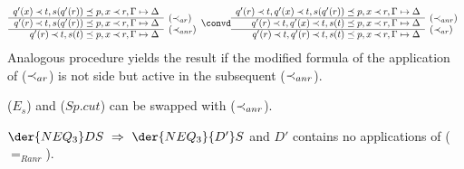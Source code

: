 \begin{PROOF}
\begin{LS}
\[ \begin{array}{rl}
q'(x)\Incl t, s(q'(r))\preceq p, x\Incl r, \Gamma\Seq\Delta \\ \cline{1-1}
q'(r)\Incl t, s(q'(r))\preceq p, x\Incl r, \Gamma\Seq\Delta  &
\raisebox{1.2ex}[1.5ex][0ex]{$(\Incl_{ar})$} \\ \cline{1-1}
q'(r)\Incl t, s(t)\preceq p, x\Incl r, \Gamma\Seq\Delta  &
\raisebox{1.2ex}[1.5ex][0ex]{$(\Incl_{anr})$}
\end{array} \convd
 \begin{array}{rl}
q'(r)\Incl t, q'(x)\Incl t, s(q'(r))\preceq p, x\Incl r, \Gamma\Seq\Delta \\ \cline{1-1}
q'(r)\Incl t, q'(x)\Incl t, s(t)\preceq p, x\Incl r, \Gamma\Seq\Delta  &
\raisebox{1.2ex}[1.5ex][0ex]{$(\Incl_{anr})$} \\ \cline{1-1}
q'(r)\Incl t, q'(r)\Incl t, s(t)\preceq p, x\Incl r, \Gamma\Seq\Delta  &
\raisebox{1.2ex}[1.5ex][0ex]{$(\Incl_{ar})$}
\end{array} \]
Analogous procedure yields the result if the modified formula of the
application of ($\mathbin{\prec}_{ar}$) is not side but active in the subsequent ($\mathbin{\prec}_{anr}$).
%
\item ($E_s$) and ($Sp.cut$) can be swapped with ($\mathbin{\prec}_{anr}$).
\end{LS}
\end{PROOF}
%
\begin{LEMMA}\label{le:noRanr}
 $\der{NEQ_3}DS\ \impl\ \der{NEQ_3}{D'}S$ and $D'$ contains no applications
 of ($=_{Ranr}$).
\end{LEMMA}
